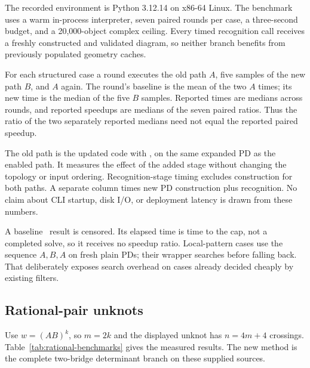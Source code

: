 The recorded environment is Python 3.12.14 on x86-64 Linux. The benchmark
uses a warm in-process interpreter, seven paired rounds per case, a
three-second budget, and a 20,000-object complex ceiling. Every timed
recognition call receives a freshly constructed and validated diagram,
so neither branch benefits from previously populated geometry caches.

For each structured case a round executes the old path \(A\), five samples
of the new path \(B\), and \(A\) again. The round's baseline is the mean
of the two \(A\) times; its new time is the median of the five \(B\) samples.
Reported times are medians across rounds, and reported speedups are
medians of the seven paired ratios. Thus the ratio of the two separately
reported medians need not equal the reported paired speedup.

The old path is the updated code with , on the
same expanded PD as the enabled path. It measures the effect of the added
stage without changing the topology or input ordering. Recognition-stage
timing excludes construction for both paths. A separate column times
new PD construction plus recognition. No claim about CLI startup, disk
I/O, or deployment latency is drawn from these numbers.

A baseline \unknown\ result is censored. Its elapsed time is time to
the cap, not a completed solve, so it receives no speedup ratio.
Local-pattern cases use the sequence \(A,B,A\) on fresh plain PDs;
their wrapper searches before falling back. That deliberately exposes
search overhead on cases already decided cheaply by existing filters.

\subsection{Rational-pair unknots}

Use \(w=(AB)^k\), so \(m=2k\) and the displayed unknot has \(n=4m+4\)
crossings. Table~\ref{tab:rational-benchmarks} gives the measured results.
The new method is the complete two-bridge determinant branch on these
supplied sources.

